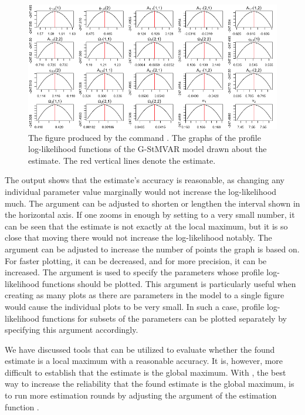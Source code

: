 \documentclass[nojss]{jss}
\begin{document}
\begin{figure}%
  \centering
  \includegraphics{figures/proflogliks.png}
  \caption{The figure produced by the command . The graphs of the profile log-likelihood functions of the G-StMVAR model drawn about the estimate. The red vertical lines denote the estimate.}
\label{fig:proflogliks}
\end{figure}

The output shows that the estimate's accuracy is reasonable, as changing any individual parameter value marginally would not increase the log-likelihood much. The argument  can be adjusted to shorten or lengthen the interval shown in the horizontal axis. If one zooms in enough by setting  to a very small number, it can be seen that the estimate is not exactly at the local maximum, but it is so close that moving there would not increase the log-likelihood notably. The argument  can be adjusted to increase the number of points the graph is based on. For faster plotting, it can be decreased, and for more precision, it can be increased. The argument  is used to specify the parameters whose profile log-likelihood functions should be plotted. This argument is particularly useful when creating as many plots as there are parameters in the model to a single figure would cause the individual plots to be very small. In such a case, profile log-likelihood functions for subsets of the parameters can be plotted separately by specifying this argument accordingly.

We have discussed tools that can be utilized to evaluate whether the found estimate is a local maximum with a reasonable accuracy. It is, however, more difficult to establish that the estimate is the global maximum. With , the best way to increase the reliability that the found estimate is the global maximum, is to run more estimation rounds by adjusting the argument  of the estimation function .
\end{document}

